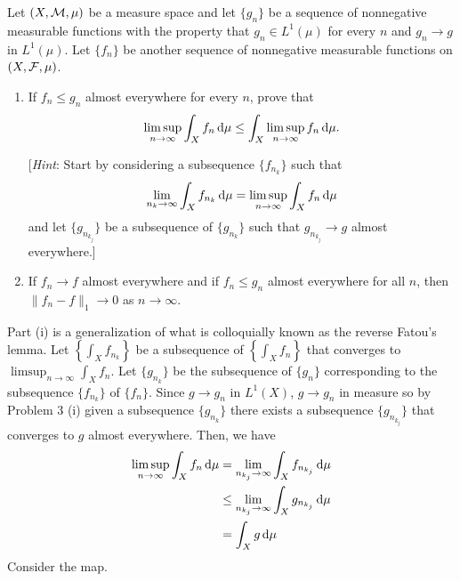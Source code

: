 \begin{problem}
  Let $(X,\mathcal{M},\mu)$ be a measure space and let $\{g_n\}$ be a sequence of
  nonnegative measurable functions with the property that $g_n\in L^1(\mu)$
  for every $n$ and $g_n\to g$ in $L^1(\mu)$. Let $\{f_n\}$ be another
  sequence of nonnegative measurable functions on $(X,\mathcal{F},\mu)$.
  \begin{enumerate}[label=(\roman*),noitemsep]
  \item If $f_n\leq g_n$ almost everywhere for every $n$, prove that
    \[
      \limsup_{n\to\infty}\int_X
      f_n\mathop{}\!\mathrm{d}\mu\leq\int_X\limsup_{n\to\infty}f_n\mathop{}\!\mathrm{d}\mu.
    \]

    [\emph{Hint}: Start by considering a subsequence $\{f_{n_k}\}$ such
    that
    \[
      \lim_{n_k\to\infty}\int_X
      f_{n_k}\mathop{}\!\mathrm{d}\mu=\limsup_{n\to\infty}\int_X f_n\mathop{}\!\mathrm{d}\mu
    \]
    and let $\{g_{n_{k_j}}\}$ be a subsequence of $\{g_{n_k}\}$ such
    that $g_{n_{k_j}}\to g$ almost everywhere.]
  \item If $f_n\to f$ almost everywhere and if $f_n\leq g_n$ almost
    everywhere for all $n$, then $\|f_n-f\|_1\to 0$ as $n\to\infty$.
  \end{enumerate}
\end{problem}
\begin{solution}
  Part (i) is a generalization of what is colloquially known as the reverse
  Fatou's lemma. Let $\left\{\int_X f_{n_k}\right\}$ be a subsequence of
  $\left\{\int_X f_n\right\}$ that converges to
  $\limsup_{n\to\infty}\int_X f_n$. Let $\{g_{n_k}\}$ be the subsequence of
  $\{g_n\}$ corresponding to the subsequence $\{f_{n_k}\}$ of
  $\{f_n\}$. Since $g\to g_n$ in $L^1(X)$, $g\to g_n$ in measure so by
  Problem 3 (i) given a subsequence $\{g_{n_k}\}$ there exists a
  subsequence $\{g_{n_{k_j}}\}$ that converges to $g$ almost
  everywhere. Then, we have
  \begin{align*}
    \limsup_{n\to\infty}\int_X f_n\diff\mu%
    &=\lim_{n_{k_j}\to\infty}\int_X f_{n_{k_j}}\diff\mu\\
    &\leq\lim_{n_{k_j}\to\infty}\int_X g_{n_{k_j}}\diff\mu\\
    &=\int_X g\diff\mu
  \end{align*}
  Consider the map.
\end{solution}

